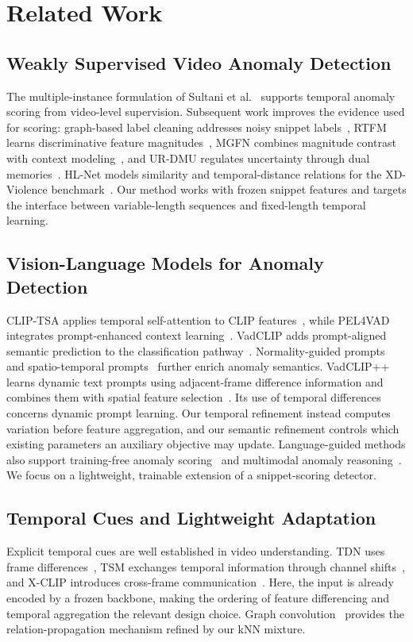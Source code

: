 \section{Related Work}
\subsection{Weakly Supervised Video Anomaly Detection}
The multiple-instance formulation of Sultani et al.~\cite{sultani2018real} supports temporal anomaly scoring from video-level supervision. Subsequent work improves the evidence used for scoring: graph-based label cleaning addresses noisy snippet labels~\cite{zhong2019gcnlnc}, RTFM learns discriminative feature magnitudes~\cite{tian2021rtfm}, MGFN combines magnitude contrast with context modeling~\cite{chen2022mgfn}, and UR-DMU regulates uncertainty through dual memories~\cite{zhou2023urdmu}. HL-Net models similarity and temporal-distance relations for the XD-Violence benchmark~\cite{wu2020xdviolence}. Our method works with frozen snippet features and targets the interface between variable-length sequences and fixed-length temporal learning.

\subsection{Vision-Language Models for Anomaly Detection}
CLIP-TSA applies temporal self-attention to CLIP features~\cite{joo2023cliptsa}, while PEL4VAD integrates prompt-enhanced context learning~\cite{pu2023pel4vad}. VadCLIP adds prompt-aligned semantic prediction to the classification pathway~\cite{wu2024vadclip}. Normality-guided prompts~\cite{yang2024tpwng} and spatio-temporal prompts~\cite{wu2024stprompt} further enrich anomaly semantics. VadCLIP++ learns dynamic text prompts using adjacent-frame difference information and combines them with spatial feature selection~\cite{liu2026vadclippp}. Its use of temporal differences concerns dynamic prompt learning. Our temporal refinement instead computes variation before feature aggregation, and our semantic refinement controls which existing parameters an auxiliary objective may update. Language-guided methods also support training-free anomaly scoring~\cite{zanella2024lavad} and multimodal anomaly reasoning~\cite{xu2025customizing}. We focus on a lightweight, trainable extension of a snippet-scoring detector.

\subsection{Temporal Cues and Lightweight Adaptation}
Explicit temporal cues are well established in video understanding. TDN uses frame differences~\cite{wang2021tdn}, TSM exchanges temporal information through channel shifts~\cite{lin2019tsm}, and X-CLIP introduces cross-frame communication~\cite{ni2022xclip}. Here, the input is already encoded by a frozen backbone, making the ordering of feature differencing and temporal aggregation the relevant design choice. Graph convolution~\cite{kipf2017gcn} provides the relation-propagation mechanism refined by our kNN mixture.

